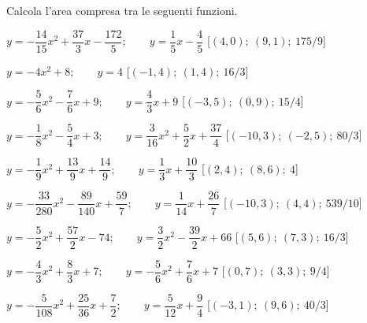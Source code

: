 \begin{esercizio}\label{ese:03.1}
Calcola l'area compresa tra le seguenti funzioni.
 \begin{enumeratea}
\item \(y=-\dfrac{14}{15}x^2 +\dfrac{37}{3}x -\dfrac{172}{5}; \qquad 
y=\dfrac{1}{5}x -\dfrac{4}{5}\) \hfill [\((4, 0);~(9, 1);~175/9\)]
\item \(y=-4x^2 +8; \qquad y=4\) \hfill [\((-1, 4);~(1, 4);~16/3\)]
\item \(y=-\dfrac{5}{6}x^2 -\dfrac{7}{6}x +9; \qquad y=\dfrac{4}{3}x +9\) 
\hfill [\((-3, 5);~(0, 9);~15/4\)]
\item \(y=-\dfrac{1}{8}x^2 -\dfrac{5}{4}x +3; \qquad y=\dfrac{3}{16}x^2 
+\dfrac{5}{2}x +\dfrac{37}{4}\) \hfill [\((-10, 3);~(-2, 5);~80/3\)]
\item \(y=-\dfrac{1}{9}x^2 +\dfrac{13}{9}x +\dfrac{14}{9}; \qquad 
y=\dfrac{1}{3}x +\dfrac{10}{3}\) \hfill [\((2, 4);~(8, 6);~4\)]
\item \(y=-\dfrac{33}{280}x^2 -\dfrac{89}{140}x +\dfrac{59}{7}; \qquad 
y=\dfrac{1}{14}x +\dfrac{26}{7}\) \hfill [\((-10, 3);~(4, 4);~539/10\)]
\item \(y=-\dfrac{5}{2}x^2 +\dfrac{57}{2}x -74; \qquad y=\dfrac{3}{2}x^2 
-\dfrac{39}{2}x +66\) \hfill [\((5, 6);~(7, 3);~16/3\)]
\item \(y=-\dfrac{4}{3}x^2 +\dfrac{8}{3}x +7; \qquad y=-\dfrac{5}{6}x^2 
+\dfrac{7}{6}x +7\) \hfill [\((0, 7);~(3, 3);~9/4\)]
\item \(y=-\dfrac{5}{108}x^2 +\dfrac{25}{36}x +\dfrac{7}{2}; \qquad 
y=\dfrac{5}{12}x +\dfrac{9}{4}\) \hfill [\((-3, 1);~(9, 6);~40/3\)]

\end{enumeratea}
\end{esercizio}
